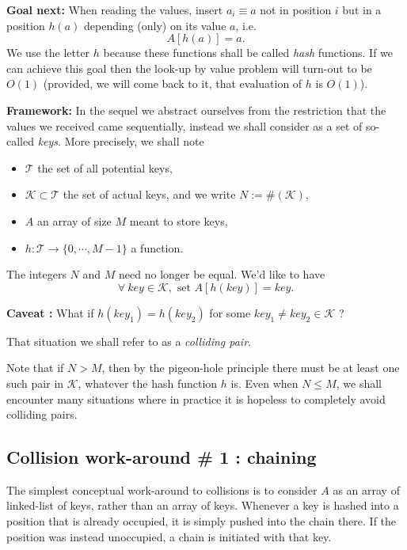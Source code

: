 \documentclass[12pt]{article}
\theoremstyle{plain}
\theoremstyle{remark}
\begin{document}
\medskip

{\bf Goal next:} When reading the values, insert $a_i \equiv a$ not in position
$i$ but in a position $h(a)$ depending (only) on its value $a$, i.e.
$$
A[h(a)] = a.
$$
We use the letter $h$ because these functions shall be called {\it hash}
functions. If we can achieve this goal then the look-up by value problem 
will turn-out to be $O(1)$ (provided, we will come back to it, that 
evaluation of $h$ is $O(1)$).

\medskip
{\bf Framework:} In the sequel we abstract ourselves from the restriction
that the values we received came sequentially, instead we shall consider
as a set of so-called {\it keys}. More precisely, we shall note 
\begin{itemize}
	\item $\mathcal{T}$ the set of all potential keys,
	\item $\mathcal{K} \subset \mathcal{T}$ the set of actual keys, and we
		write $N := \#(\mathcal{K})$,
	\item $A$ an array of size $M$ meant to store keys,
	\item $h : \mathcal{T} \to \{0,\cdots, M-1\}$ a function.
\end{itemize}
The integers $N$ and $M$ need no longer be equal. We'd like to have
$$
\forall\ key \in \mathcal{K}, \text{ set } A[h(key)] = key.
$$

{\bf Caveat :} What if $h(key_1) = h(key_2)$ for some $key_1 \neq key_2 \in
\mathcal{K}$ ?

That situation we shall refer to as a {\it colliding pair}.

Note that if $N > M$, then by the pigeon-hole principle there must be at least
one such pair in $\mathcal{K}$, whatever the hash function $h$ is. Even when 
$N \leq M$, we shall encounter many situations where in practice it is
hopeless to completely avoid colliding pairs.

\subsection{Collision work-around \# 1 : chaining} 

The simplest conceptual work-around to collisions is to consider $A$ as
an array of linked-list of keys, rather than an array of keys. Whenever
a key is hashed into a position that is already occupied, it is simply 
pushed into the chain there. If the position was instead unoccupied, a
chain is initiated with that key.
\end{document}
